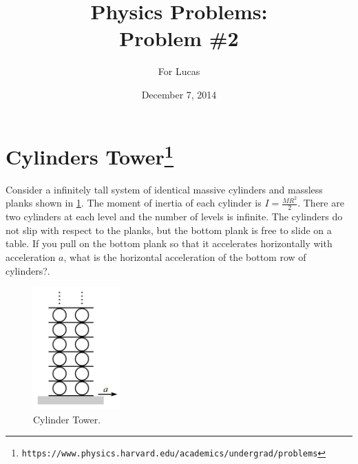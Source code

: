 \documentclass{article}
\begin{document}
\title{Physics Problems:\\ Problem \#2}

\author{For Lucas}

\date{December 7, 2014}
\maketitle


\section*{Cylinders Tower\footnote{\texttt{https://www.physics.harvard.edu/academics/undergrad/problems}}}

Consider a infinitely tall system of identical massive cylinders and massless planks shown in \ref{fig:tower}. The moment of inertia of each cylinder is $I = \frac{MR^2}{2}$. There are two cylinders at each level and the number of levels is infinite. The cylinders do not slip with respect to the planks, but the bottom plank is free to slide on a table. If you pull on the bottom plank so that it accelerates horizontally with acceleration $a$, what is the horizontal acceleration of the bottom row of cylinders?.\\

\begin{figure}[h!]
\begin{center}
\includegraphics[width=0.3\textwidth]{tower.png}
\end{center}
\caption{Cylinder Tower.}
\label{fig:tower}
\end{figure}
\end{document}
